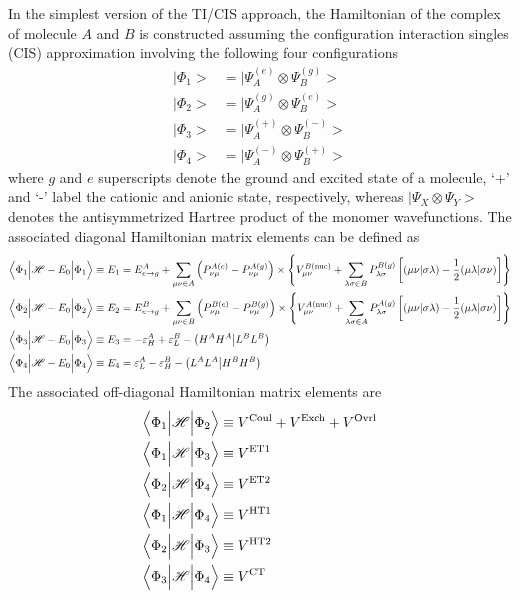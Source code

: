 In the simplest version of the TI/CIS approach, the Hamiltonian of the 
complex of molecule $A$ and $B$ is constructed assuming the configuration interaction
singles (CIS) approximation involving the following four configurations
%
\begin{align}
 \Big| \Phi_1 \Big> &= \Big| \Psi_A^{(e)} \otimes \Psi_B^{(g)} \Big> \\
 \Big| \Phi_2 \Big> &= \Big| \Psi_A^{(g)} \otimes \Psi_B^{(e)} \Big> \\
 \Big| \Phi_3 \Big> &= \Big| \Psi_A^{(+)} \otimes \Psi_B^{(-)} \Big> \\
 \Big| \Phi_4 \Big> &= \Big| \Psi_A^{(-)} \otimes \Psi_B^{(+)} \Big> 
\end{align}
%
where $g$ and $e$ superscripts denote the ground and excited state of a molecule,
`+' and `-' label the cationic and anionic state, respectively, 
whereas $ \Big| \Psi_X \otimes \Psi_Y \Big> $ denotes the antisymmetrized Hartree product
of the monomer wavefunctions.
The associated diagonal Hamiltonian matrix elements can be defined as
%
\begin{align}
 \Big< \Phi_1 \Big| \mathscr{H} -E_{0} \Big| \Phi_1 \Big> &\equiv E_1 = E^A_{e\rightarrow g} 
     + \sum_{\mu\nu\in A} \left( P_{\nu\mu}^{A(e)} - P_{\nu\mu}^{A(g)}\right) \times
     \left\{ V_{\mu\nu}^{B({\rm nuc})} + \sum_{\lambda\sigma\in B} P_{\lambda\sigma}^{B(g)} 
     \left[ (\mu\nu | \sigma\lambda) - \frac{1}{2} (\mu\lambda | \sigma\nu) \right] \right\} \\
 \Big< \Phi_2 \Big| \mathscr{H} -E_{0} \Big| \Phi_2 \Big> &\equiv E_2 = E^B_{e\rightarrow g} 
     + \sum_{\mu\nu\in B} \left( P_{\nu\mu}^{B(e)} - P_{\nu\mu}^{B(g)}\right) \times
     \left\{ V_{\mu\nu}^{A({\rm nuc})} + \sum_{\lambda\sigma\in A} P_{\lambda\sigma}^{A(g)} 
     \left[ (\mu\nu | \sigma\lambda) - \frac{1}{2} (\mu\lambda | \sigma\nu) \right] \right\} \\
 \Big< \Phi_3 \Big| \mathscr{H} -E_{0} \Big| \Phi_3 \Big> &\equiv E_3 = 
 -\varepsilon_H^A + \varepsilon_L^B - \big( H^A H^A \big| L^B L^B \big)  \\
 \Big< \Phi_4 \Big| \mathscr{H} -E_{0} \Big| \Phi_4 \Big> &\equiv E_4 = 
  \varepsilon_L^A - \varepsilon_H^B - \big( L^A L^A \big| H^B H^B \big)  
\end{align}
%
The associated off\hyp{}diagonal Hamiltonian matrix elements are
%
\begin{align}
 \Big< \Phi_1 \Big| \mathscr{H} \Big| \Phi_2 \Big> &\equiv V^{\rm Coul} + V^{\rm Exch} + V^{\rm Ovrl}\\
 \Big< \Phi_1 \Big| \mathscr{H} \Big| \Phi_3 \Big> &\equiv V^{\rm ET1} \\
 \Big< \Phi_2 \Big| \mathscr{H} \Big| \Phi_4 \Big> &\equiv V^{\rm ET2} \\
 \Big< \Phi_1 \Big| \mathscr{H} \Big| \Phi_4 \Big> &\equiv V^{\rm HT1} \\
 \Big< \Phi_2 \Big| \mathscr{H} \Big| \Phi_3 \Big> &\equiv V^{\rm HT2} \\
 \Big< \Phi_3 \Big| \mathscr{H} \Big| \Phi_4 \Big> &\equiv V^{\rm CT } 
\end{align}
